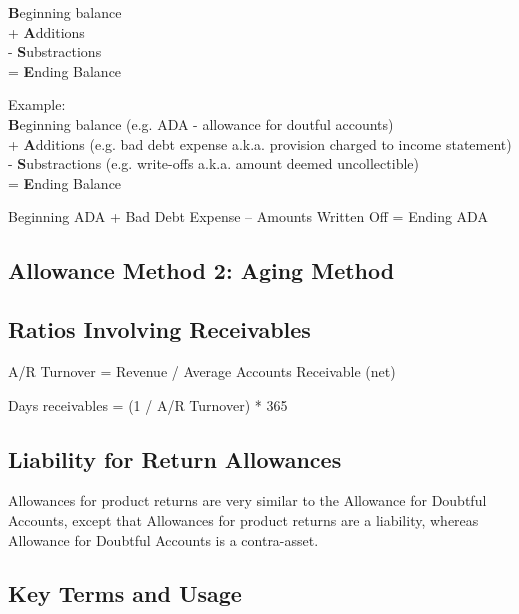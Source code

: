 \textbf{B}eginning balance\\
+ \textbf{A}dditions \\
- \textbf{S}ubstractions \\
= \textbf{E}nding Balance

Example: \\

\textbf{B}eginning balance (e.g. ADA - allowance for doutful accounts) \\
+ \textbf{A}dditions (e.g. bad debt expense a.k.a. provision charged to income statement)\\
- \textbf{S}ubstractions (e.g. write-offs a.k.a. amount deemed uncollectible) \\
= \textbf{E}nding Balance

Beginning ADA + Bad Debt Expense – Amounts Written Off = Ending ADA


\subsection*{Allowance Method 2: Aging Method}


\subsection*{Ratios Involving Receivables}

A/R Turnover = Revenue / Average Accounts Receivable (net)

Days receivables = (1 / A/R Turnover) * 365

\subsection*{Liability for Return Allowances}

Allowances for product returns are very similar to the Allowance for Doubtful Accounts, except that Allowances for product returns are a liability, whereas Allowance for Doubtful Accounts is a contra-asset.

\subsection*{Key Terms and Usage}

